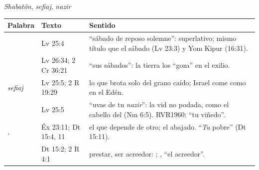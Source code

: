 \begin{frame}{\emph{Shabatón}, \emph{sefiaj}, \emph{nazir}}
\scriptsize\renewcommand{\arraystretch}{1.18}
\begin{tabular}{@{}L{2.5cm}L{2.0cm}L{7.4cm}@{}}
\toprule
\textbf{Palabra} & \textbf{Texto} & \textbf{Sentido} \\ \midrule
{} & Lv 25:4 & ``sábado de reposo solemne'': superlativo; mismo título que el sábado (Lv 23:3) y Yom Kipur (16:31). \\
 & Lv 26:34; 2 Cr 36:21 & ``sus sábados'': la tierra los ``goza'' en el exilio. \\
 \emph{sefiaj} & Lv 25:5; 2 R 19:29 & lo que brota solo del grano caído; Israel come como en el Edén. \\
 & Lv 25:5 & ``uvas de tu \emph{nazir}'': la vid no podada, como el cabello del  (Nm 6:5). RVR1960: ``tu viñedo''. \\
,  & Éx 23:11; Dt 15:4, 11 & el que depende de otro; el abajado. ``\emph{Tu} pobre'' (Dt 15:11). \\
 & Dt 15:2; 2 R 4:1 & prestar, ser acreedor: ; , ``el acreedor''. \\
\bottomrule
\end{tabular}\par\medskip
{}
\end{frame}

